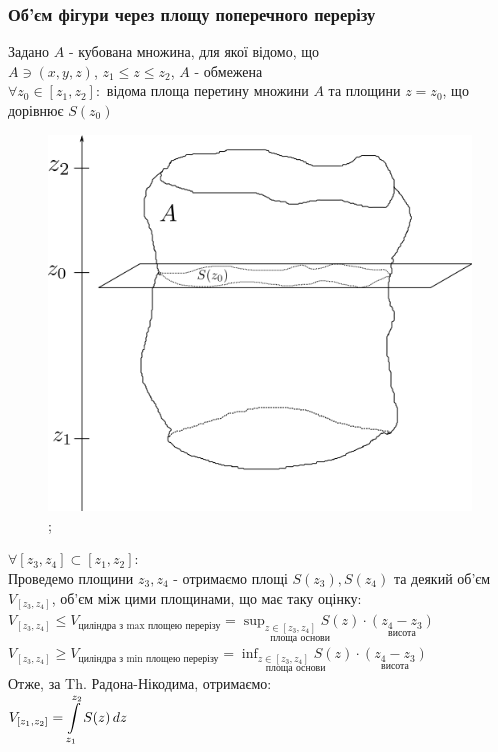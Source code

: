 \documentclass[a4paper, 14pt]{extarticle}
\def\huge{\displaystyle}
\def\bigline{\vspace{5mm}\\}
\theoremstyle{theoremdd}
\theoremstyle{theoremdd}
\theoremstyle{theoremdd}
\theoremstyle{theoremdd}
\theoremstyle{theoremdd}
\theoremstyle{theoremdd}
\theoremstyle{theoremdd}
\theoremstyle{theoremdd}
\begin{document}
\subsubsection{Об'єм фігури через площу поперечного перерізу}
Задано $A$ - кубована множина, для якої відомо, що\\
$A \ni (x,y,z)$, $z_1 \leq z \leq z_2$, $A$ - обмежена\\
$\forall z_0 \in [z_1,z_2]:$ відома площа перетину множини $A$ та площини $z=z_0$, що дорівнює $S(z_0)$
\begin{figure}[H]
\centering
\includegraphics[scale=0.6]{volume_with_surface.png};
\end{figure}

$\forall [z_3,z_4] \subset [z_1,z_2]:$\\
Проведемо площини $z_3,z_4$ - отримаємо площі $S(z_3),S(z_4)$ та деякий об'єм $V_{[z_3,z_4]}$, об'єм між цими площинами, що має таку оцінку:\\
$V_{[z_3,z_4]} \leq V_{\text{циліндра з max площею перерізу}} = \huge \underset{\text{площа основи}}{\sup_{z \in [z_3,z_4]} S(z)} \cdot \underset{\text{висота}}{(z_4-z_3)}$\\
$V_{[z_3,z_4]} \geq V_{\text{циліндра з min площею перерізу}} = \huge \underset{\text{площа основи}}{\inf_{z \in [z_3,z_4]} S(z)} \cdot \underset{\text{висота}}{(z_4-z_3)}$\\
Отже, за Th. Радона-Нікодима, отримаємо:\\
$V_{[z_1,z_2]} = \huge\int\displaylimits_{z_1}^{z_2} S(z)\,dz$
\bigline
\end{document}
